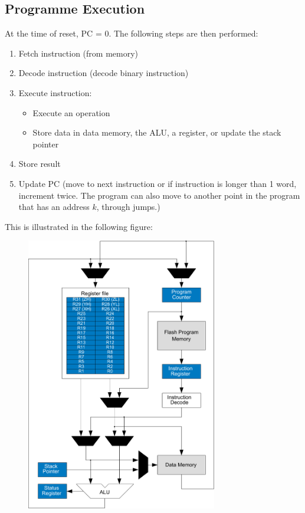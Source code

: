 \documentclass{article}
\begin{document}
\subsection{Programme Execution}
At the time of reset, PC = 0. The following steps are then performed:
\begin{enumerate}
    \item Fetch instruction (from memory)
    \item Decode instruction (decode binary instruction)
    \item Execute instruction:
          \begin{itemize}
              \item Execute an operation
              \item Store data in data memory, the ALU, a register, or update the stack pointer
          \end{itemize}
    \item Store result
    \item Update PC (move to next instruction or if instruction is longer than 1 word, increment twice. The program can also move to another point in the program that has an address \(k\), through jumps.)
\end{enumerate}
This is illustrated in the following figure:
\begin{figure}[H]
    \centering
    \includegraphics[height = 12cm, keepaspectratio = true]{figures/AVR_CPU.pdf}
\end{figure}
\end{document}
